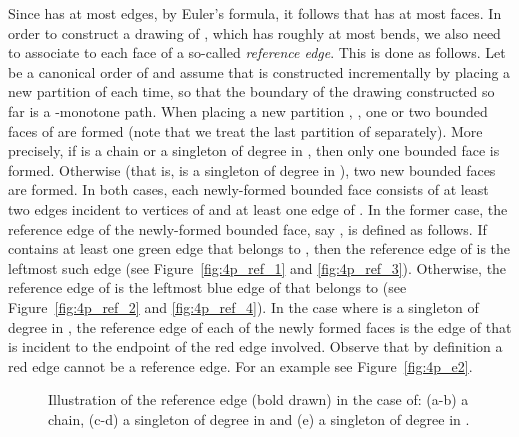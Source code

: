 \documentclass[a4paper,twoside,11pt]{article}
\begin{document}
Since  has at most  edges, by Euler's formula, it follows that
 has at most  faces. In order to construct a drawing
 of , which has roughly at most  bends, we also
need to associate to each face of  a so-called \emph{reference
edge}. This is done as follows. Let  be
a canonical order of  and assume that  is constructed
incrementally by placing a new partition of  each time, so that
the boundary of the drawing constructed so far is a -monotone
path. When placing a new partition , ,
one or two bounded faces of  are formed (note that we treat the
last partition  of  separately). More precisely, if 
is a chain or a singleton of degree  in , then only one
bounded face is formed. Otherwise (that is,  is a singleton of
degree  in ), two new bounded faces are formed. In both
cases, each newly-formed bounded  face consists of at least two edges
incident to vertices of  and at least one edge of . In
the former case, the reference edge of the newly-formed bounded face,
say , is defined as follows. If  contains at least one green
edge that belongs to , then the reference edge of  is the
leftmost such edge (see Figure~\ref{fig:4p_ref_1} and
\ref{fig:4p_ref_3}). Otherwise, the reference edge of  is the
leftmost blue edge of  that belongs to  (see
Figure~\ref{fig:4p_ref_2} and \ref{fig:4p_ref_4}). In the case where
 is a singleton of degree  in , the reference edge of
each of the newly formed faces is the edge of  that is
incident to the endpoint of the red edge involved. Observe that by
definition a red edge cannot be a reference edge. For an example see
Figure~\ref{fig:4p_e2}.

\begin{figure}[t]
    \centering 
    \begin{minipage}[b]{.17\textwidth}
        \centering
    \end{minipage} 
    \begin{minipage}[b]{.17\textwidth}
        \centering 
    \end{minipage}
    \begin{minipage}[b]{.17\textwidth}
        \centering 
    \end{minipage}
    \begin{minipage}[b]{.17\textwidth}
        \centering 
    \end{minipage}
    \begin{minipage}[b]{.17\textwidth}
        \centering 
    \end{minipage}
    \caption{Illustration of the reference edge (bold drawn) in the case of: 
    (a-b) a chain, 
    (c-d) a singleton of degree  in  and 
    (e) a singleton of degree  in .}
    \label{fig:4p_ref}
\end{figure}
\end{document}
